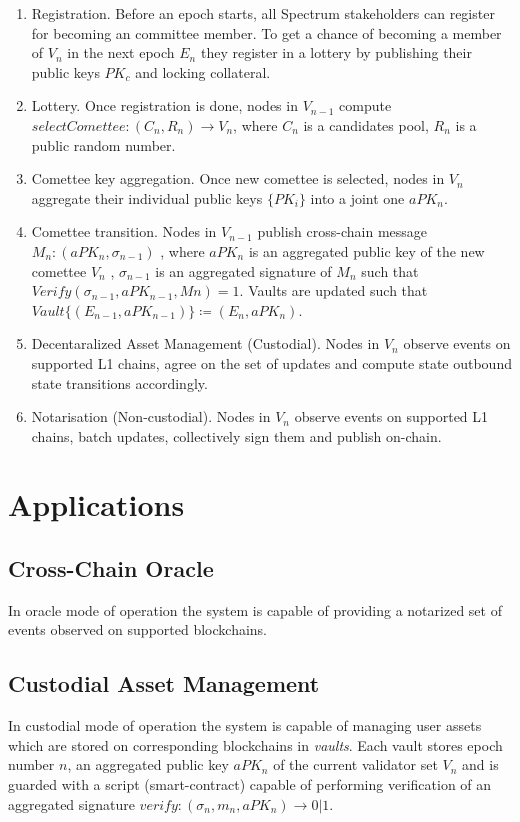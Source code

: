 \documentclass{article}
\begin{document}
    \begin{enumerate}
        \item Registration.
        Before an epoch starts, all Spectrum stakeholders can register for becoming an committee member.
        To get a chance of becoming a member of $V_n$ in the next epoch $E_n$ they register in a lottery
        by publishing their public keys $PK_c$ and locking collateral.
        \item Lottery.
        Once registration is done, nodes in $V_{n-1}$ compute $selectComettee: (C_n, R_n) \rightarrow V_n$,
        where  $C_n$ is a candidates pool, $R_n$ is a public random number.
        \item Comettee key aggregation.
        Once new comettee is selected, nodes in $V_n$ aggregate their individual public keys $\{PK_i\}$ into
        a joint one $aPK_n$.
        \item Comettee transition.
        Nodes in $V_{n-1}$ publish cross-chain message $M_n : (aPK_n, \sigma_{n-1})$ , where $aPK_n$ is
        an aggregated public key of the new comettee $V_n$ , $\sigma_{n-1}$ is an aggregated signature of
        $M_n$ such that $Verify(\sigma_{n-1}, aPK_{n-1}, Mn) = 1$.
        Vaults are updated such that $Vault\{(E_{n-1}, aPK_{n-1})\} \coloneqq (E_n, aPK_n)$.
        \item Decentaralized Asset Management (Custodial).
        Nodes in $V_n$ observe events on supported L1 chains, agree on the set of updates
        and compute state outbound state transitions accordingly.
        \item Notarisation (Non-custodial).
        Nodes in $V_n$ observe events on supported L1 chains, batch updates, collectively sign them and
        publish on-chain.
    \end{enumerate}


    \section{Applications}\label{sec:applications}

    \subsection{Cross-Chain Oracle}\label{subsec:cross-chain-oracle}
    In oracle mode of operation the system is capable of providing a notarized set of events observed on supported blockchains.

    \subsection{Custodial Asset Management}\label{subsec:custodial-asset-management}
    In custodial mode of operation the system is capable of managing user assets which are stored on corresponding blockchains in \emph{vaults}.
    Each vault stores epoch number $n$, an aggregated public key $aPK_n$ of the current validator set $V_n$ and
    is guarded with a script (smart-contract) capable of performing verification of
    an aggregated signature $verify: (\sigma_n, m_n, aPK_n) \rightarrow 0 | 1$.
\end{document}

